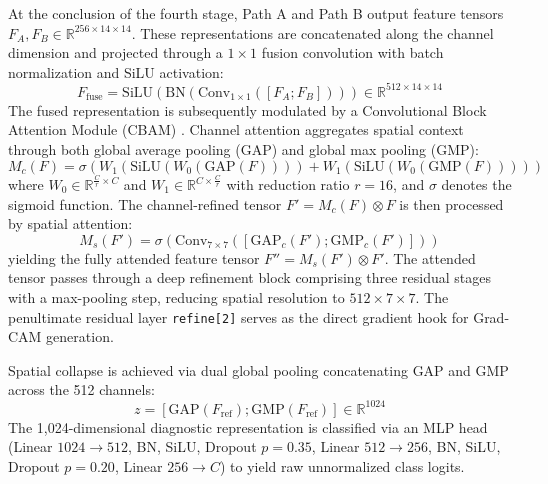 \documentclass[conference]{IEEEtran}
\begin{document}
At the conclusion of the fourth stage, Path A and Path B output feature tensors $F_A, F_B \in \mathbb{R}^{256\times 14\times 14}$. These representations are concatenated along the channel dimension and projected through a $1\times 1$ fusion convolution with batch normalization and SiLU activation:
\begin{equation}
    F_{\text{fuse}} = \text{SiLU}\left(\text{BN}\left(\text{Conv}_{1\times 1}\left([F_A ; F_B]\right)\right)\right) \in \mathbb{R}^{512\times 14\times 14}
\end{equation}
The fused representation is subsequently modulated by a Convolutional Block Attention Module (CBAM) \cite{woo2018cbam}. Channel attention aggregates spatial context through both global average pooling (GAP) and global max pooling (GMP):
\begin{equation}
    M_c(F) = \sigma\left(W_1\left(\text{SiLU}(W_0(\text{GAP}(F)))\right) + W_1\left(\text{SiLU}(W_0(\text{GMP}(F)))\right)\right)
\end{equation}
where $W_0 \in \mathbb{R}^{\frac{C}{r}\times C}$ and $W_1 \in \mathbb{R}^{C\times\frac{C}{r}}$ with reduction ratio $r=16$, and $\sigma$ denotes the sigmoid function. The channel-refined tensor $F' = M_c(F) \otimes F$ is then processed by spatial attention:
\begin{equation}
    M_s(F') = \sigma\left(\text{Conv}_{7\times 7}\left([\text{GAP}_c(F') ; \text{GMP}_c(F')]\right)\right)
\end{equation}
yielding the fully attended feature tensor $F'' = M_s(F') \otimes F'$. The attended tensor passes through a deep refinement block comprising three residual stages with a max-pooling step, reducing spatial resolution to $512\times 7\times 7$. The penultimate residual layer \texttt{refine[2]} serves as the direct gradient hook for Grad-CAM generation.

Spatial collapse is achieved via dual global pooling concatenating GAP and GMP across the 512 channels:
\begin{equation}
    z = [\text{GAP}(F_{\text{ref}}) ; \text{GMP}(F_{\text{ref}})] \in \mathbb{R}^{1024}
\end{equation}
The 1,024-dimensional diagnostic representation is classified via an MLP head (Linear $1024\to 512$, BN, SiLU, Dropout $p=0.35$, Linear $512\to 256$, BN, SiLU, Dropout $p=0.20$, Linear $256\to C$) to yield raw unnormalized class logits.
\end{document}
